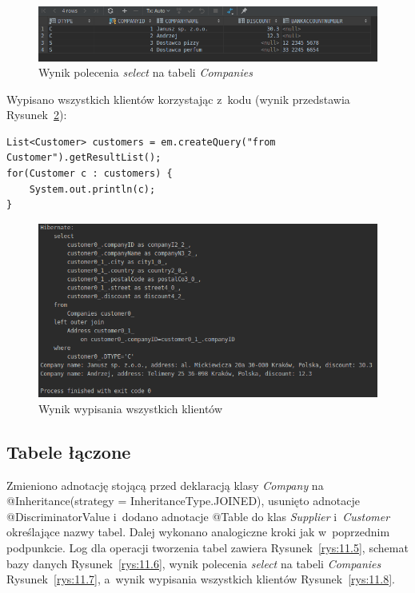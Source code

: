 \documentclass[12pt, a4paper]{mwart}
\begin{document}
\begin{figure}[ht]
  \centering
  \includegraphics[scale=0.5]{XI/11-3.png}
  \caption{Wynik polecenia \textit{select} na tabeli \textit{Companies}}
  \label{rys:11.3}
\end{figure}

Wypisano wszystkich klientów korzystając z~kodu (wynik przedstawia Rysunek~\ref{rys:11.4}):
\begin{lstlisting}
List<Customer> customers = em.createQuery("from Customer").getResultList();
for(Customer c : customers) {
	System.out.println(c);
}
\end{lstlisting}

\begin{figure}[ht]
  \centering
  \includegraphics[scale=0.5]{XI/11-4.png}
  \caption{Wynik wypisania wszystkich klientów}
  \label{rys:11.4}
\end{figure}

\clearpage
\subsection{Tabele łączone}

Zmieniono adnotację stojącą przed deklaracją klasy \textit{Company} na @Inheritance(strategy = InheritanceType.JOINED), usunięto adnotacje @DiscriminatorValue i~dodano adnotacje @Table do klas \textit{Supplier} i~\textit{Customer} określające nazwy tabel. Dalej wykonano analogiczne kroki jak w~poprzednim podpunkcie. Log dla operacji tworzenia tabel zawiera Rysunek~\ref{rys:11.5}, schemat bazy danych Rysunek~\ref{rys:11.6}, wynik polecenia \textit{select} na tabeli \textit{Companies} Rysunek~\ref{rys:11.7}, a~wynik wypisania wszystkich klientów Rysunek~\ref{rys:11.8}.
\end{document}
